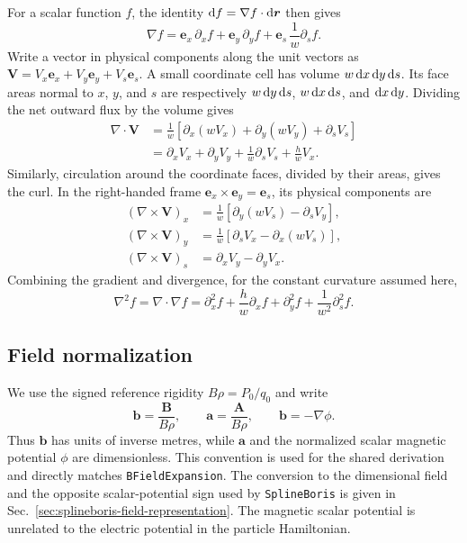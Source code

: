 For a scalar function \(f\), the identity
\(\text{d} f=\nabla f\cdot\text{d}\bm r\) then gives
\begin{equation}
 \nabla f=\bm e_x\,\partial_x f+\bm e_y\,\partial_y f
                         +\bm e_s\,\frac{1}{w}\partial_s f.
 \label{bfe:gradient}
\end{equation}
Write a vector in physical components along the unit vectors as
\(\bm V=V_x\bm e_x+V_y\bm e_y+V_s\bm e_s\).
A small coordinate cell has volume \(w\,\text{d} x\,\text{d} y\,\text{d} s\).
Its face areas normal to \(x\), \(y\), and \(s\) are respectively
\(w\,\text{d} y\,\text{d} s\), \(w\,\text{d} x\,\text{d} s\), and
\(\text{d} x\,\text{d} y\). Dividing the net outward flux by the volume gives
\begin{align}
 \nabla\cdot\bm V
 &=\frac{1}{w}\left[\partial_x(wV_x)+\partial_y(wV_y)
                                      +\partial_s V_s\right]\\
 &=\partial_x V_x+\partial_y V_y+\frac{1}{w}\partial_s V_s
                                      +\frac{h}{w}V_x.
 \label{bfe:divergence}
\end{align}
Similarly, circulation around the coordinate faces, divided by their
areas, gives the curl. In the right-handed frame
\(\bm e_x\times\bm e_y=\bm e_s\), its physical components are
\begin{equation}
 \begin{aligned}
 (\nabla\times\bm V)_x
   &=\frac{1}{w}\left[\partial_y(wV_s)-\partial_s V_y\right],\\
 (\nabla\times\bm V)_y
   &=\frac{1}{w}\left[\partial_s V_x-\partial_x(wV_s)\right],\\
 (\nabla\times\bm V)_s
   &=\partial_x V_y-\partial_y V_x.
 \end{aligned}
 \label{bfe:curl-operator}
\end{equation}
Combining the gradient and divergence, for the constant curvature assumed here,
\begin{equation}
 \nabla^2 f=\nabla\cdot\nabla f
 =\partial_x^2 f+\frac{h}{w}\partial_x f+\partial_y^2 f
                                      +\frac{1}{w^2}\partial_s^2 f.
 \label{bfe:scalar-laplacian}
\end{equation}

\subsection{Field normalization}

We use the signed reference rigidity \(B\rho=P_0/q_0\) and write
\begin{equation}
 \bm b=\frac{\bm B}{B\rho}, \qquad
 \bm a=\frac{\bm A}{B\rho}, \qquad
 \bm b=-\nabla\phi.
 \label{bfe:normalization}
\end{equation}
Thus \(\bm b\) has units of inverse metres, while \(\bm a\) and the
normalized scalar magnetic potential \(\phi\) are dimensionless.
This convention is used for the shared derivation and directly matches
\texttt{BFieldExpansion}. The conversion to the dimensional field and the
opposite scalar-potential sign used by \texttt{SplineBoris} is given in
Sec.~\ref{sec:splineboris-field-representation}. The magnetic scalar
potential is unrelated to the electric potential in the particle Hamiltonian.

